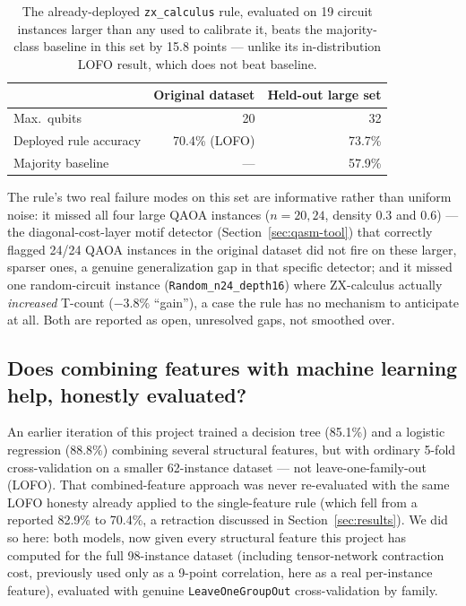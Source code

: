 \documentclass[9pt,twocolumn]{extarticle}
\begin{document}
\begin{table}[t]
\centering\footnotesize
\begin{tabular}{lrr}
\toprule
& Original dataset & Held-out large set \\
\midrule
Max.\ qubits & 20 & 32 \\
Deployed rule accuracy & 70.4\% (LOFO) & 73.7\% \\
Majority baseline & --- & 57.9\% \\
\bottomrule
\end{tabular}
\caption{The already-deployed \texttt{zx\_calculus} rule, evaluated on 19
circuit instances larger than any used to calibrate it, beats the
majority-class baseline in this set by 15.8 points --- unlike its
in-distribution LOFO result, which does not beat baseline.}
\label{tab:largescale}
\end{table}

The rule's two real failure modes on this set are informative rather than
uniform noise: it missed all four large QAOA instances ($n{=}20,24$,
density $0.3$ and $0.6$) --- the diagonal-cost-layer motif detector
(Section~\ref{sec:qasm-tool}) that correctly flagged 24/24 QAOA instances
in the original dataset did not fire on these larger, sparser ones, a
genuine generalization gap in that specific detector; and it missed one
random-circuit instance (\texttt{Random\_n24\_depth16}) where ZX-calculus
actually \emph{increased} T-count ($-3.8\%$ ``gain''), a case the rule has
no mechanism to anticipate at all. Both are reported as open, unresolved
gaps, not smoothed over.

\subsection{Does combining features with machine learning help, honestly evaluated?}
\label{sec:stresstest-ml}
An earlier iteration of this project trained a decision tree (85.1\%) and a
logistic regression (88.8\%) combining several structural features, but
with ordinary 5-fold cross-validation on a smaller 62-instance dataset ---
not leave-one-family-out (LOFO). That combined-feature approach was never
re-evaluated with the same LOFO honesty already applied to the
single-feature rule (which fell from a reported 82.9\% to 70.4\%, a
retraction discussed in Section~\ref{sec:results}). We did so here: both
models, now given every structural feature this project has computed for
the full 98-instance dataset (including tensor-network contraction cost,
previously used only as a 9-point correlation, here as a real per-instance
feature), evaluated with genuine \texttt{LeaveOneGroupOut} cross-validation
by family.
\end{document}
